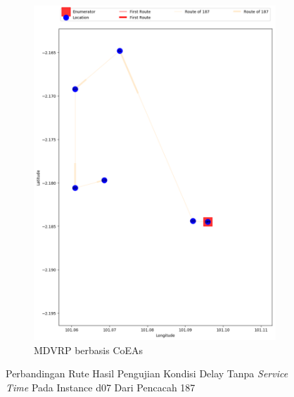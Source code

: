 \begin{figure}[H]
	\centering
	\begin{subfigure}[t]{\textwidth}
		\centering
		\includegraphics[width=\textwidth]{Resources/Images/delayed_7/real_m15_n100_delayed_7_187_coes}
		\caption{MDVRP berbasis CoEAs}
		\label{fig:real_m15_n100_delayed_7_187_coes}
	\end{subfigure}
	\caption{Perbandingan Rute Hasil Pengujian Kondisi Delay Tanpa \textit{Service Time} Pada Instance d07 Dari Pencacah 187}
	\label{fig:real_m15_n100_delayed_7_187}
\end{figure}



